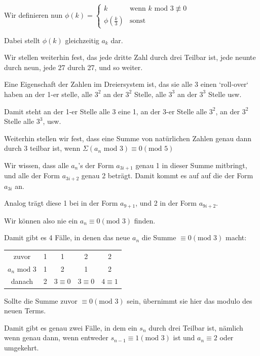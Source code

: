 \documentclass[11pt]{article}
\begin{document}
    Wir definieren nun $\phi(k) = \begin{cases}k & \text{wenn } k\text{ mod }3 \not \equiv 0 \\\phi(\frac{k}{3}) & \text{sonst}\end{cases}$

    Dabei stellt $\phi(k)$ gleichzeitig $a_k$ dar.

    \bigskip

    Wir stellen weiterhin fest, das jede dritte Zahl durch drei Teilbar ist, jede neunte durch neun,
    jede 27 durch 27, und so weiter.

    \bigskip

    Eine Eigenschaft der Zahlen im Dreiersystem ist, das sie alle 3 einen `roll-over` haben an der
    1-er stelle, alle $3^2$ an der $3^2$ Stelle, alle $3^3$ an der $3^3$ Stelle usw.

    Damit steht an der 1-er Stelle alle 3 eine 1, an der 3-er Stelle alle $3^2$, an der $3^2$ Stelle
    alle $3^3$, usw.

    \bigskip

    Weiterhin stellen wir fest, dass eine Summe von natürlichen Zahlen genau dann durch 3 teilbar ist,
    wenn $\Sigma(a_n\text{ mod }3) \equiv 0 (\text{mod }5)$

    Wir wissen, dass alle $a_n$'s der Form $a_{3i+1}$ genau 1 in dieser Summe mitbringt,
    und alle der Form $a_{3i+2}$ genau 2 beträgt.
    Damit kommt es auf auf die der Form $a_{3i}$ an.

    Analog trägt diese 1 bei in der Form $a_{9+1}$, und 2 in der Form $a_{9i+2}$.

    Wir können also nie ein $a_n \equiv 0 (\text{mod }3)$ finden.

    Damit gibt es 4 Fälle, in denen das neue $a_n$ die Summe $\equiv 0 (\text{mod }3)$ macht:

    \begin{tabular}{c c c c c}
        zuvor & 1 & 1 & 2 & 2 \\
        $a_n \text{ mod } 3$ & 1 & 2 & 1 & 2 \\
        danach & 2 & $3 \equiv 0$ & $3 \equiv 0$ & $4 \equiv 1$
    \end{tabular}

    \bigskip

    Sollte die Summe zuvor $\equiv 0 (\text{mod } 3)$ sein, übernimmt sie hier das modulo des neuen Terms.

    Damit gibt es genau zwei Fälle, in dem ein $s_n$ durch drei Teilbar ist, nämlich wenn
    genau dann, wenn entweder $s_{n-1} \equiv 1 (\text{mod } 3)$ ist und $a_n \equiv 2$ oder umgekehrt.
\end{document}
